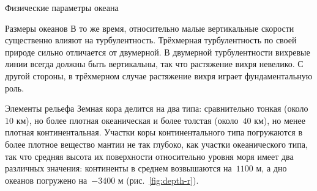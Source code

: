 \begin{chapter}{Физические параметры океана}
\begin{section}{Размеры океанов}
В то же время, относительно малые вертикальные скорости существенно влияют
на турбулентность. Трёхмерная турбулентность по своей природе сильно
отличается от двумерной. В двумерной турбулентности вихревые линии
всегда должны быть вертикальны, так что растяжение вихря невелико.
С другой стороны, в трёхмерном случае растяжение вихря
играет фундаментальную роль.
%
\end{section}

\begin{section}{Элементы рельефа}
Земная кора делится на два типа: сравнительно тонкая (около~$10\mbox{~км}$), 
но более плотная океаническая и более толстая (около~$40\mbox{~км}$), но
менее плотная континентальная. Участки коры континентального типа погружаются
в более плотное вещество мантии не так глубоко, как участки океанического типа,
так что средняя высота их поверхности относительно уровня моря имеет два
различных значения: континенты в среднем возвышаются на~$1100\mbox{~м}$, 
а дно океанов погружено на~$-3400\mbox{~м}$ (рис.~\ref{fig:depth-r}).
%


\end{section}
\end{chapter}
